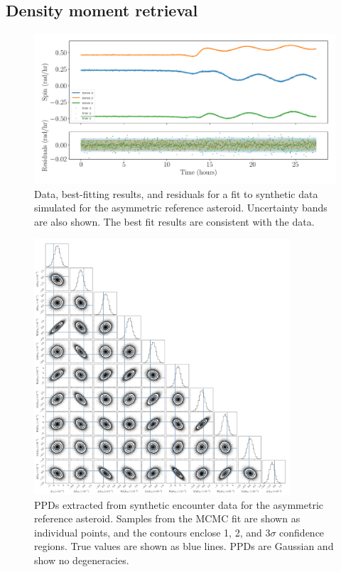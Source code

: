 \documentclass[fleqn,usenatbib]{mnras}
\begin{document}
\subsection{Density moment retrieval}
\label{sec:results-moment}
\begin{figure}
  \centering
  \includegraphics[width=\linewidth]{figs/example-residuals.pdf}
  \caption{Data, best-fitting results, and residuals for a fit to synthetic data simulated for the asymmetric reference asteroid. Uncertainty bands are also shown. The best fit results are consistent with the data.}
  \label{fig:example-residuals}
\end{figure}

\begin{figure}
  \centering
  \includegraphics[width=0.85\textwidth]{figs/example-corner.png}
  \caption{PPDs extracted from synthetic encounter data for the asymmetric reference asteroid. Samples from the MCMC fit are shown as individual points, and the contours enclose 1, 2, and 3$\sigma$ confidence regions. True values are shown as blue lines. PPDs are Gaussian and show no degeneracies.}
  \label{fig:example-corner}
\end{figure}
\end{document}
